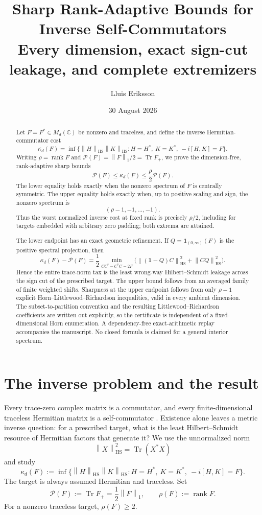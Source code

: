 \documentclass[11pt]{article}
\title{\textbf{Sharp Rank-Adaptive Bounds for Inverse Self-Commutators}\\[1.5mm]
\large Every dimension, exact sign-cut leakage, and complete extremizers}
\author{Lluis Eriksson}
\date{30 August 2026}
\theoremstyle{definition}
\theoremstyle{remark}
\newcommand{\Tr}{\operatorname{Tr}}
\newcommand{\rank}{\operatorname{rank}}
\newcommand{\1}{\mathbf 1}
\newcommand{\norm}[1]{\left\lVert #1\right\rVert}
\newcommand{\HS}{\mathrm{HS}}
\newcommand{\PP}{\mathcal P}
\begin{document}
\maketitle

\begin{abstract}
Let $F=F^*\in M_d(\mathbb C)$ be nonzero and traceless, and define the inverse Hermitian-commutator cost
\[
 \kappa_d(F)=\inf\{\norm H_{\HS}\norm K_{\HS}:H=H^*,\ K=K^*,\ -i[H,K]=F\}.
\]
Writing $\rho=\rank F$ and $\PP(F)=\norm F_1/2=\Tr F_+$, we prove the dimension-free, rank-adaptive sharp bounds
\[
 \boxed{\qquad \PP(F)\le \kappa_d(F)\le \frac{\rho}{2}\PP(F).\qquad}
\]
The lower equality holds exactly when the nonzero spectrum of $F$ is centrally symmetric.  The upper equality holds exactly when, up to positive scaling and sign, the nonzero spectrum is
\[
 (\rho-1,-1,\ldots,-1).
\]
Thus the worst normalized inverse cost at fixed rank is precisely $\rho/2$, including for targets embedded with arbitrary zero padding; both extrema are attained.

The lower endpoint has an exact geometric refinement.  If $Q=\1_{(0,\infty)}(F)$ is the positive spectral projection, then
\[
 \kappa_d(F)-\PP(F)
 =\frac12\min_{CC^*-C^*C=2F}
 \bigl(\norm{(\1-Q)C}_{\HS}^2+\norm{CQ}_{\HS}^2\bigr).
\]
Hence the entire trace-norm tax is the least wrong-way Hilbert--Schmidt leakage across the sign cut of the prescribed target.  The upper bound follows from an averaged family of finite weighted shifts.  Sharpness at the upper endpoint follows from only $\rho-1$ explicit Horn--Littlewood--Richardson inequalities, valid in every ambient dimension.  The subset-to-partition convention and the resulting Littlewood--Richardson coefficients are written out explicitly, so the certificate is independent of a fixed-dimensional Horn enumeration.  A dependency-free exact-arithmetic replay accompanies the manuscript.  No closed formula is claimed for a general interior spectrum.
\end{abstract}

\section{The inverse problem and the result}

Every trace-zero complex matrix is a commutator, and every finite-dimensional traceless Hermitian matrix is a self-commutator \cite{albert1957,thompson1958,fan1980}.  Existence alone leaves a metric inverse question: for a prescribed target, what is the least Hilbert--Schmidt resource of Hermitian factors that generate it?  We use the unnormalized norm
\[
 \norm X_{\HS}^2=\Tr(X^*X)
\]
and study
\begin{equation}
 \kappa_d(F):=\inf\{\norm H_{\HS}\norm K_{\HS}:H=H^*,\ K=K^*,\ -i[H,K]=F\}.
 \label{eq:kappa}
\end{equation}
The target is always assumed Hermitian and traceless.  Set
\begin{equation}
 \PP(F):=\Tr F_+=\frac12\norm F_1,
 \qquad \rho(F):=\rank F.
 \label{eq:P-rho}
\end{equation}
For a nonzero traceless target, $\rho(F)\ge2$.
\end{document}
